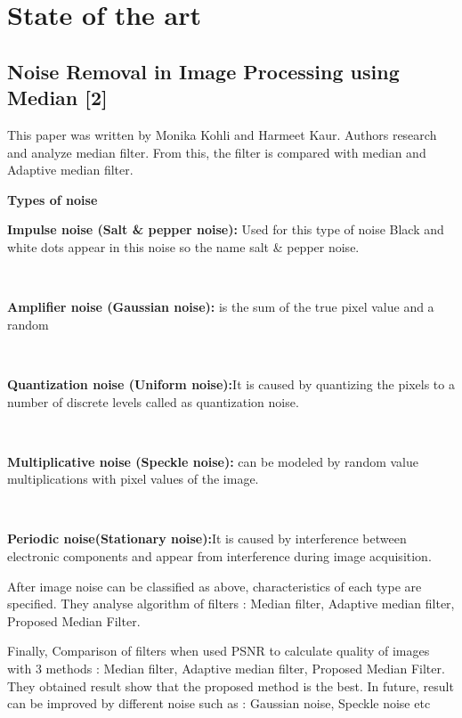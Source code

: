\chapter{State of the art}
\section{Noise Removal in Image Processing using Median [2]}

This paper was written by Monika Kohli and Harmeet Kaur. Authors research and analyze median filter. From this, the filter is compared with median and Adaptive median filter. 
\vspace{1cm}

\textbf{Types of noise}
\vspace{0.5cm}

\textbf{Impulse noise (Salt \& pepper noise):}  Used for this type of noise  Black and white dots appear in this noise so the name salt \& pepper noise. 

\

\textbf{Amplifier noise (Gaussian noise):} 
is the sum of the true pixel value and a random 

\

\textbf{Quantization noise (Uniform noise):}It is caused by quantizing the pixels to a number of discrete levels called as quantization noise. 

\

\textbf{Multiplicative noise (Speckle noise):} can be modeled by random value multiplications with pixel values of the image.



\

\textbf{Periodic noise(Stationary noise):}It is caused by interference between electronic components and appear from interference during image acquisition.
\vspace{0.5cm}

After image noise can be classified as above, characteristics of each type are specified. They analyse algorithm of filters : Median filter, Adaptive median filter, Proposed Median Filter.  
\vspace{1cm}


Finally, Comparison of filters when used PSNR to calculate quality of images with 3 methods : Median filter, Adaptive median filter, Proposed Median Filter. They obtained result show that the proposed method is the best. In future, result can be improved by different noise such as : Gaussian noise, Speckle noise etc
\vspace{1.5cm}

